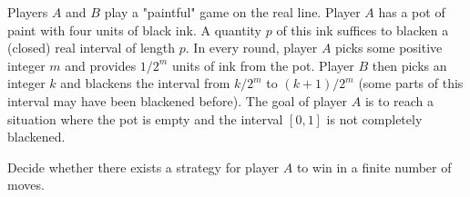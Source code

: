 Players 
$A$
 and 
$B$
 play a "paintful" game on the real line. Player 
$A$
 has a pot of paint with four units of black ink. A quantity 
$p$
 of this ink suffices to blacken a (closed) real interval of length 
$p$.
 In every round, player 
$A$
 picks some positive integer 
$m$
 and provides 
$1/2^m $
 units of ink from the pot. Player 
$B$
 then picks an integer 
$k$
 and blackens the interval from 
$k/2^m$
 to 
$(k+1)/2^m$
 (some parts of this interval may have been blackened before). The goal of player 
$A$
 is to reach a situation where the pot is empty and the interval 
$[0,1]$
 is not completely blackened.


Decide whether there exists a strategy for player 
$A$
 to win in a finite number of moves.
